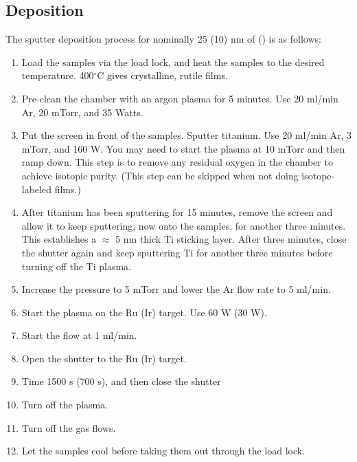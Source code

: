 \subsection{Deposition}
The sputter deposition  process for nominally 25 (10) nm of  () is as follows:
\begin{enumerate}
	\item Load the samples via the load lock, and heat the samples to the desired temperature. 400$^\circ$C gives crystalline, rutile films.
	
	\item Pre-clean the chamber with an argon plasma for 5 minutes. Use 20 ml/min Ar, 20 mTorr, and 35 Watts.
	
	\item Put the screen in front of the samples. Sputter titanium. Use 20 ml/min Ar, 3 mTorr, and 160 W. You may need to start the plasma at 10 mTorr and then ramp down. This step is to remove any residual oxygen in the chamber to achieve isotopic purity. (This step can be skipped when not doing isotope-labeled films.)
	
	\item After titanium has been sputtering for 15 minutes, remove the screen and allow it to keep sputtering, now onto the samples, for another three minutes. This establishes a $\approx$ 5 nm thick Ti sticking layer. After three minutes, close the shutter again and keep sputtering Ti for another three minutes before turning off the Ti plasma.
	
	\item Increase the pressure to 5 mTorr and lower the Ar flow rate to 5 ml/min. 
	
	\item Start the plasma on the Ru (Ir) target. Use 60 W (30 W).
	
	\item Start the  flow at 1 ml/min.
	
	\item Open the shutter to the Ru (Ir) target. 
	
	\item Time 1500 s (700 s), and then close the shutter
	
	\item Turn off the plasma.
	
	\item Turn off the gas flows.
	
	\item Let the samples cool before taking them out through the load lock.
\end{enumerate}
